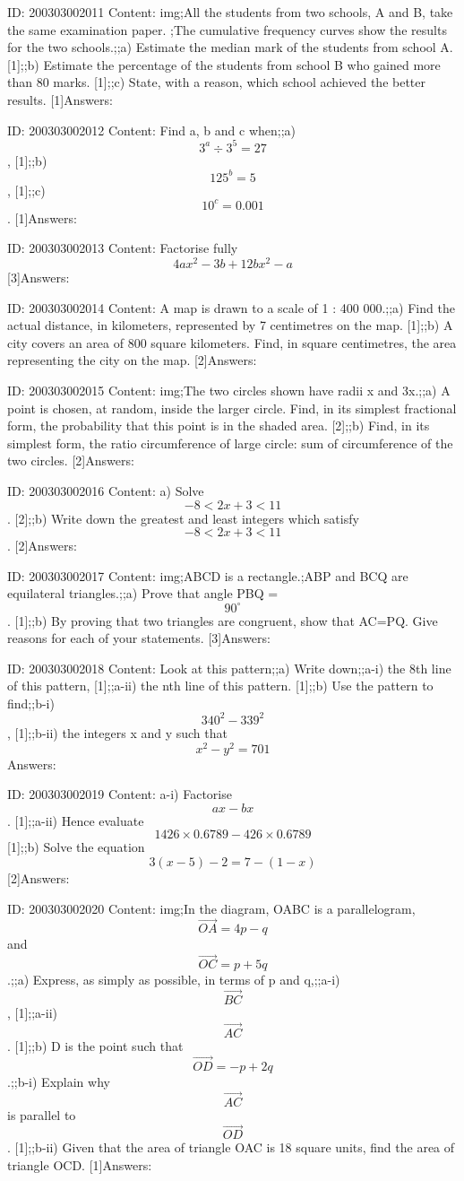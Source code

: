 \documentclass{article}
\begin{document}
ID: 200303002011
Content:
img;All the students from two schools, A and B, take the same examination paper. ;The cumulative frequency curves show the results for the two schools.;;a) Estimate the median mark of the students from school A.   [1];;b) Estimate the percentage of the students from school B who gained more than 80 marks.   [1];;c) State, with a reason, which school achieved the better results.   [1]Answers:

ID: 200303002012
Content:
Find a, b and c when;;a) $$3^a \div 3^5 =27$$,   [1];;b) $$125^b = 5$$,   [1];;c) $$10^c = 0.001$$.   [1]Answers:

ID: 200303002013
Content:
Factorise fully $$4ax^2 - 3b + 12bx^2 - a$$ [3]Answers:

ID: 200303002014
Content:
A map is drawn to a scale of 1 : 400 000.;;a) Find the actual distance, in kilometers, represented by 7 centimetres on the map.   [1];;b) A city covers an area of 800 square kilometers. Find, in square centimetres, the area representing the city on the map.   [2]Answers:

ID: 200303002015
Content:
img;The two circles shown have radii x and 3x.;;a) A point is chosen, at random, inside the larger circle. Find, in its simplest fractional form, the probability that this point is in the shaded area.   [2];;b) Find, in its simplest form, the ratio circumference of large circle: sum of circumference of the two circles.   [2]Answers:

ID: 200303002016
Content:
a) Solve $$-8 < 2x + 3 < 11$$. [2];;b) Write down the greatest and least integers which satisfy $$-8 < 2x + 3 < 11$$. [2]Answers:

ID: 200303002017
Content:
img;ABCD is a rectangle.;ABP and BCQ are equilateral triangles.;;a) Prove that angle PBQ = $$90^{\circ}$$.   [1];;b) By proving that two triangles are congruent, show that AC=PQ. Give reasons for each of your statements.   [3]Answers:

ID: 200303002018
Content:
Look at this pattern;;a) Write down;;a-i) the 8th line of this pattern,   [1];;a-ii) the nth line of this pattern.   [1];;b) Use the pattern to find;;b-i) $$340^2 - 339^2$$,   [1];;b-ii) the integers x and y such that $$x^2-y^2=701$$ Answers:

ID: 200303002019
Content:
a-i) Factorise $$ax - bx$$.   [1];;a-ii) Hence evaluate $$1426 \times 0.6789 - 426 \times 0.6789$$ [1];;b) Solve the equation $$3(x - 5) -2 = 7 - (1 - x)$$ [2]Answers:

ID: 200303002020
Content:
img;In the diagram, OABC is a parallelogram, $$\vec{OA} = 4p - q$$ and $$\vec{OC} = p+5q$$.;;a) Express, as simply as possible, in terms of p and q,;;a-i) $$\vec{BC}$$,   [1];;a-ii) $$\vec{AC}$$.   [1];;b) D is the point such that $$\vec{OD} = -p + 2q$$.;;b-i) Explain why $$\vec{AC}$$ is parallel to $$\vec{OD}$$.   [1];;b-ii) Given that the area of triangle OAC is 18 square units, find the area of triangle OCD.   [1]Answers:
\end{document}
